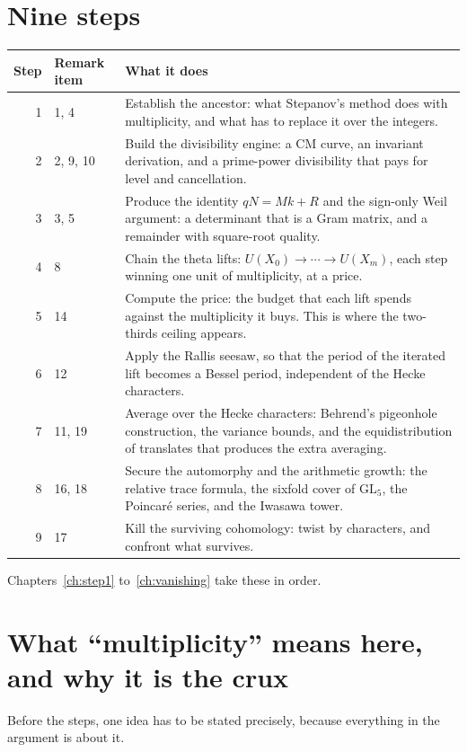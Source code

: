 \section{Nine steps}\begin{center}
\small
\setlength{\extrarowheight}{-1pt}
\begin{tabular}{@{}rl>{\RaggedRight\arraybackslash\hyphenpenalty=10000\exhyphenpenalty=10000}p{}@{}}
\toprule
\textbf{Step} & \textbf{Remark item} & \textbf{What it does} \\
\midrule
1 & 1, 4 & Establish the ancestor: what Stepanov's method does with
multiplicity, and what has to replace it over the integers. \\
2 & 2, 9, 10 & Build the divisibility engine: a CM curve, an invariant
derivation, and a prime-power divisibility that pays for level and
cancellation. \\
3 & 3, 5 & Produce the identity $qN = Mk + R$ and the sign-only Weil
argument: a determinant that is a Gram matrix, and a remainder with
square-root quality. \\
4 & 8 & Chain the theta lifts: $U(X_0) \to \cdots \to U(X_m)$, each step
winning one unit of multiplicity, at a price. \\
5 & 14 & Compute the price: the budget that each lift spends against the
multiplicity it buys. This is where the two-thirds ceiling appears. \\
6 & 12 & Apply the Rallis seesaw, so that the period of the iterated lift
becomes a Bessel period, independent of the Hecke characters. \\
7 & 11, 19 & Average over the Hecke characters: Behrend's pigeonhole
construction, the variance bounds, and the equidistribution of translates
that produces the extra averaging. \\
8 & 16, 18 & Secure the automorphy and the arithmetic growth: the relative
trace formula, the sixfold cover of $\mathrm{GL}_5$, the Poincar\'e series,
and the Iwasawa tower. \\
9 & 17 & Kill the surviving cohomology: twist by characters, and confront
what survives. \\
\bottomrule
\end{tabular}
\end{center}

Chapters~\ref{ch:step1} to~\ref{ch:vanishing} take these in order.

\section{What ``multiplicity'' means here, and why it is the crux}Before the steps, one idea has to be stated precisely, because everything in
the argument is about it.

